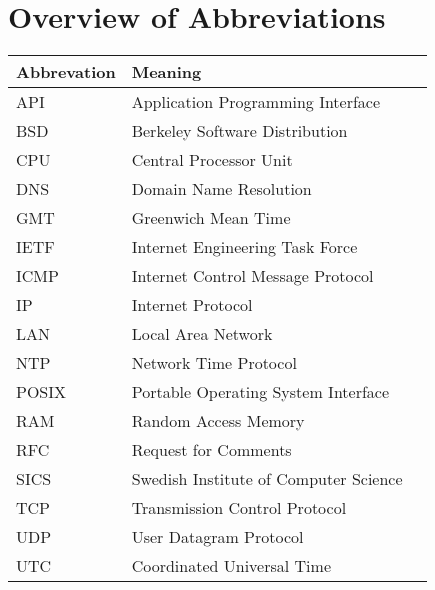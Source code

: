 \chapter{Overview of Abbreviations}
\begin{tabular}{|l|l|l|}
	\hline
	Abbrevation & Meaning \\ \hline
	API & Application Programming Interface \\
	BSD & Berkeley Software Distribution \\
	CPU & Central Processor Unit \\
	DNS & Domain Name Resolution \\
	GMT & Greenwich Mean Time \\
	IETF & Internet Engineering Task Force \\
	ICMP & Internet Control Message Protocol \\
	IP & Internet Protocol \\
	LAN & Local Area Network \\
	NTP & Network Time Protocol \\
	POSIX & Portable Operating System Interface \\
	RAM & Random Access Memory \\
	RFC & Request for Comments \\
	SICS & Swedish Institute of Computer Science \\
	TCP & Transmission Control Protocol \\
	UDP & User Datagram Protocol \\
	UTC & Coordinated Universal Time \\
	\hline
\end{tabular}
